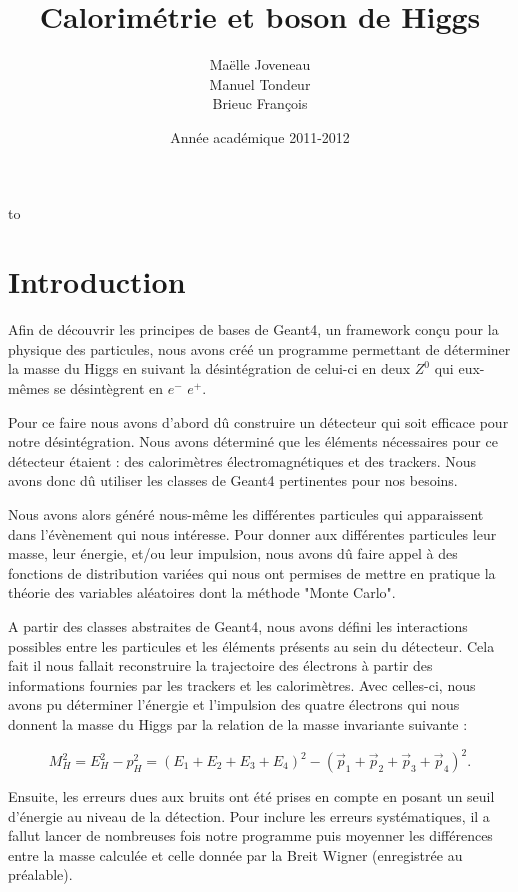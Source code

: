 \documentclass[11pt]{article}
\title{Calorimétrie et boson de Higgs}
\author{ Maëlle Joveneau \\ Manuel Tondeur \\ Brieuc François }
\date{Année académique 2011-2012}
\makeatletter
\def\clap#1{\hbox to 0pt{\hss #1\hss}}%
\def\haut#1#2#3{%
\hbox to \hsize{%
\rlap{\vtop{\raggedright #1}}%
\hss
\clap{\vtop{\centering #2}}%
\hss
\llap{\vtop{\raggedleft #3}}}}%
\def\bas#1#2#3{%
\hbox to \hsize{%
\rlap{\vbox{\raggedright #1}}%
\hss
\clap{\vbox{\centering #2}}%
\hss
\llap{\vbox{\raggedleft #3}}}}%
\def\maketitle{%
\thispagestyle{empty}\vbox to \vsize{%
\haut{}{\@blurb}{}
\vfill
\vspace{1cm}
\begin{flushleft}
\usefont{OT1}{ptm}{m}{n}
\huge \@title
\end{flushleft}
\par
\hrule height 4pt
\par
\begin{flushright}
\usefont{OT1}{phv}{m}{n}
\Large \@author
\par
\end{flushright}
\vspace{1cm}
\vfill
\vfill
\bas{}{\@location, \@date}{}
}%
\cleardoublepage
}
\makeatother
\begin{document}
	\maketitle
		
	\tableofcontents

	\newpage
	
			\section{Introduction}
	Afin de d\'ecouvrir les principes de bases de Geant4, un framework conçu
pour la physique des particules, nous avons cr\'eé un programme permettant de
d\'eterminer la masse du Higgs en suivant la d\'esint\'egration de celui-ci en
deux $Z^0$ qui eux-m\^emes se d\'esint\`egrent en $e^-$ $e^+$.

Pour ce faire nous avons d'abord dû construire un d\'etecteur qui soit efficace
pour notre d\'esint\'egration. Nous avons d\'etermin\'e que les \'el\'ements
n\'ecessaires pour ce d\'etecteur \'etaient : des calorim\`etres
\'electromagn\'etiques et des trackers. Nous avons donc dû utiliser les classes
de Geant4 pertinentes pour nos besoins.
 
Nous avons alors g\'en\'er\'e nous-m\^eme les diff\'erentes particules qui
apparaissent dans l'\'ev\`enement qui nous int\'eresse. Pour donner aux
diff\'erentes particules leur masse, leur \'energie, et/ou leur impulsion, nous
avons dû faire appel \`a des fonctions de distribution vari\'ees qui nous ont
permises de mettre en pratique la th\'eorie des variables aléatoires dont la
méthode "Monte Carlo".
 
A partir des classes abstraites de Geant4, nous avons défini les interactions
possibles entre les particules et les \'el\'ements pr\'esents au sein du
d\'etecteur. Cela fait il nous fallait reconstruire la trajectoire des
\'electrons \`a partir des informations fournies par les trackers et les
calorim\`etres. Avec celles-ci, nous avons pu d\'eterminer l'\'energie et
l'impulsion des quatre \'electrons qui nous donnent la masse du Higgs par la
relation de la masse invariante suivante : 
 
\begin{equation}
M_H^2=E_H^2-p_H^2=(E_1+E_2+E_3+E_4)^2-(\vec{p}_1+\vec{p}_2+\vec{p}_3+\vec{p}_4)^2.
\end{equation} 
    
Ensuite, les erreurs dues aux bruits ont \'et\'e prises en compte en posant un seuil d'\'energie au niveau de la 
d\'etection. Pour inclure les erreurs syst\'ematiques, il a fallut lancer de nombreuses fois notre programme puis
moyenner les diff\'erences entre la masse calcul\'ee et celle donn\'ee par la Breit Wigner 
(enregistr\'ee au pr\'ealable). 
\end{document}
